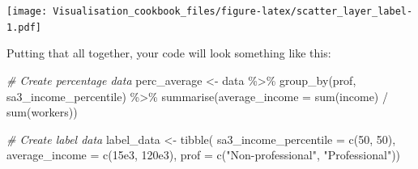 \documentclass[
]{book}
\newenvironment{Shaded}{\begin{snugshade}}{\end{snugshade}}
\newcommand{\AttributeTok}[1]{\textcolor[rgb]{0.77,0.63,0.00}{#1}}
\newcommand{\CommentTok}[1]{\textcolor[rgb]{0.56,0.35,0.01}{\textit{#1}}}
\newcommand{\DecValTok}[1]{\textcolor[rgb]{0.00,0.00,0.81}{#1}}
\newcommand{\FloatTok}[1]{\textcolor[rgb]{0.00,0.00,0.81}{#1}}
\newcommand{\FunctionTok}[1]{\textcolor[rgb]{0.00,0.00,0.00}{#1}}
\newcommand{\NormalTok}[1]{#1}
\newcommand{\OtherTok}[1]{\textcolor[rgb]{0.56,0.35,0.01}{#1}}
\newcommand{\SpecialCharTok}[1]{\textcolor[rgb]{0.00,0.00,0.00}{#1}}
\newcommand{\StringTok}[1]{\textcolor[rgb]{0.31,0.60,0.02}{#1}}
\begin{document}
\texttt{[image: Visualisation\_cookbook\_files/figure-latex/scatter\_layer\_label-1.pdf]}

Putting that all together, your code will look something like this:

\begin{Shaded}
\begin{Highlighting}[]
\CommentTok{\# Create percentage data}
\NormalTok{perc\_average }\OtherTok{\textless{}{-}}\NormalTok{ data }\SpecialCharTok{\%\textgreater{}\%} 
  \FunctionTok{group\_by}\NormalTok{(prof, sa3\_income\_percentile) }\SpecialCharTok{\%\textgreater{}\%} 
  \FunctionTok{summarise}\NormalTok{(}\AttributeTok{average\_income =} \FunctionTok{sum}\NormalTok{(income) }\SpecialCharTok{/} \FunctionTok{sum}\NormalTok{(workers))}

\CommentTok{\# Create label data}
\NormalTok{label\_data }\OtherTok{\textless{}{-}} \FunctionTok{tibble}\NormalTok{(}
  \AttributeTok{sa3\_income\_percentile =} \FunctionTok{c}\NormalTok{(}\DecValTok{50}\NormalTok{, }\DecValTok{50}\NormalTok{),}
  \AttributeTok{average\_income =} \FunctionTok{c}\NormalTok{(}\FloatTok{15e3}\NormalTok{, }\FloatTok{120e3}\NormalTok{),}
  \AttributeTok{prof =}  \FunctionTok{c}\NormalTok{(}\StringTok{"Non{-}professional"}\NormalTok{, }\StringTok{"Professional"}\NormalTok{))}



\end{Highlighting}
\end{Shaded}
\end{document}
